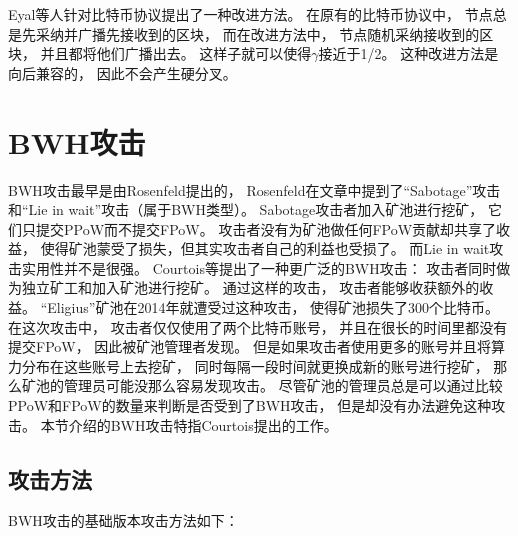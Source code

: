 \documentclass[a4paper, 11pt]{article}
\begin{document}
\begin{CJK*}{UTF8}{gbsn}
    Eyal等人针对比特币协议提出了一种改进方法。
    在原有的比特币协议中，
    节点总是先采纳并广播先接收到的区块，
    而在改进方法中，
    节点随机采纳接收到的区块，
    并且都将他们广播出去。
    这样子就可以使得$\gamma$接近于1/2。
    这种改进方法是向后兼容的，
    因此不会产生硬分叉。

    \section{BWH攻击}

    \indent

    BWH攻击最早是由Rosenfeld\cite{ref_BWH1}提出的，
    Rosenfeld在文章中提到了“Sabotage”攻击和“Lie in wait”攻击（属于BWH类型）。
    Sabotage攻击者加入矿池进行挖矿，
    它们只提交PPoW而不提交FPoW。
    攻击者没有为矿池做任何FPoW贡献却共享了收益，
    使得矿池蒙受了损失，但其实攻击者自己的利益也受损了。
    而Lie in wait攻击实用性并不是很强。
    Courtois\cite{ref_BWH2}等提出了一种更广泛的BWH攻击：
    攻击者同时做为独立矿工和加入矿池进行挖矿。
    通过这样的攻击，
    攻击者能够收获额外的收益。
    “Eligius”矿池在2014年就遭受过这种攻击，
    使得矿池损失了300个比特币\cite{ref_web5}。
    在这次攻击中，
    攻击者仅仅使用了两个比特币账号，
    并且在很长的时间里都没有提交FPoW，
    因此被矿池管理者发现。
    但是如果攻击者使用更多的账号并且将算力分布在这些账号上去挖矿，
    同时每隔一段时间就更换成新的账号进行挖矿，
    那么矿池的管理员可能没那么容易发现攻击。
    尽管矿池的管理员总是可以通过比较PPoW和FPoW的数量来判断是否受到了BWH攻击，
    但是却没有办法避免这种攻击。
    本节介绍的BWH攻击特指Courtois提出的工作\cite{ref_BWH2}。

    \subsection{攻击方法}

    \indent

    BWH攻击的基础版本攻击方法如下：


\end{CJK*}
\end{document}
